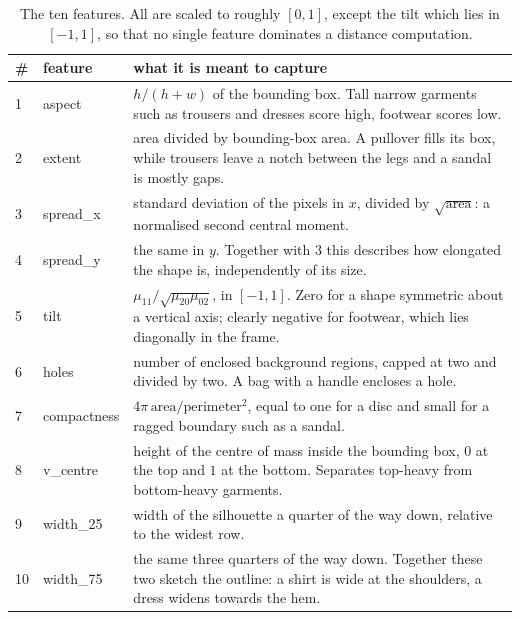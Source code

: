 \documentclass[11pt]{article}
\begin{document}
\begin{table}[H]
    \centering
    \begin{tabular}{llp{8.2cm}}
        \toprule
        \# & feature & what it is meant to capture \\
        \midrule
        1 & aspect & $h/(h+w)$ of the bounding box. Tall narrow garments such
            as trousers and dresses score high, footwear scores low. \\
        2 & extent & area divided by bounding-box area. A pullover fills its
            box, while trousers leave a notch between the legs and a sandal is
            mostly gaps. \\
        3 & spread\_x & standard deviation of the pixels in $x$, divided by
            $\sqrt{\text{area}}$: a normalised second central moment. \\
        4 & spread\_y & the same in $y$. Together with 3 this describes how
            elongated the shape is, independently of its size. \\
        5 & tilt & $\mu_{11}/\sqrt{\mu_{20}\mu_{02}}$, in $[-1,1]$. Zero for a
            shape symmetric about a vertical axis; clearly negative for
            footwear, which lies diagonally in the frame. \\
        6 & holes & number of enclosed background regions, capped at two and
            divided by two. A bag with a handle encloses a hole. \\
        7 & compactness & $4\pi\,\text{area}/\text{perimeter}^2$, equal to one
            for a disc and small for a ragged boundary such as a sandal. \\
        8 & v\_centre & height of the centre of mass inside the bounding box,
            $0$ at the top and $1$ at the bottom. Separates top-heavy from
            bottom-heavy garments. \\
        9 & width\_25 & width of the silhouette a quarter of the way down,
            relative to the widest row. \\
        10 & width\_75 & the same three quarters of the way down. Together
            these two sketch the outline: a shirt is wide at the shoulders, a
            dress widens towards the hem. \\
        \bottomrule
    \end{tabular}
    \caption{The ten features. All are scaled to roughly $[0,1]$, except the
    tilt which lies in $[-1,1]$, so that no single feature dominates a distance
    computation.}
\end{table}
\end{document}
